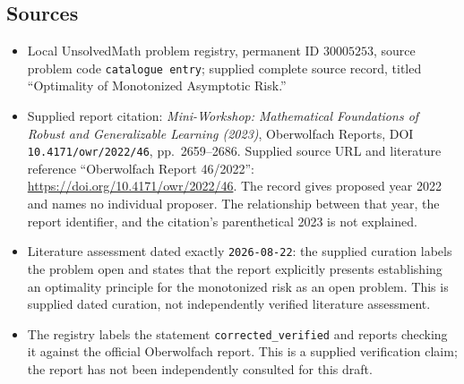 \documentclass[11pt]{article}
\begin{document}
\subsection{Sources}
\begin{itemize}
\item Local UnsolvedMath problem registry, permanent ID \(30005253\), source problem code \texttt{catalogue entry}; supplied complete source record, titled ``Optimality of Monotonized Asymptotic Risk.''
\item Supplied report citation: \emph{Mini-Workshop: Mathematical Foundations of Robust and Generalizable Learning (2023)}, Oberwolfach Reports, DOI \texttt{10.4171/owr/2022/46}, pp.\ 2659--2686. Supplied source URL and literature reference ``Oberwolfach Report 46/2022'': \url{https://doi.org/10.4171/owr/2022/46}. The record gives proposed year 2022 and names no individual proposer. The relationship between that year, the report identifier, and the citation's parenthetical 2023 is not explained.
\item Literature assessment dated exactly \texttt{2026-08-22}: the supplied curation labels the problem open and states that the report explicitly presents establishing an optimality principle for the monotonized risk as an open problem. This is supplied dated curation, not independently verified literature assessment.
\item The registry labels the statement \texttt{corrected\_verified} and reports checking it against the official Oberwolfach report. This is a supplied verification claim; the report has not been independently consulted for this draft.
\end{itemize}
\end{document}
